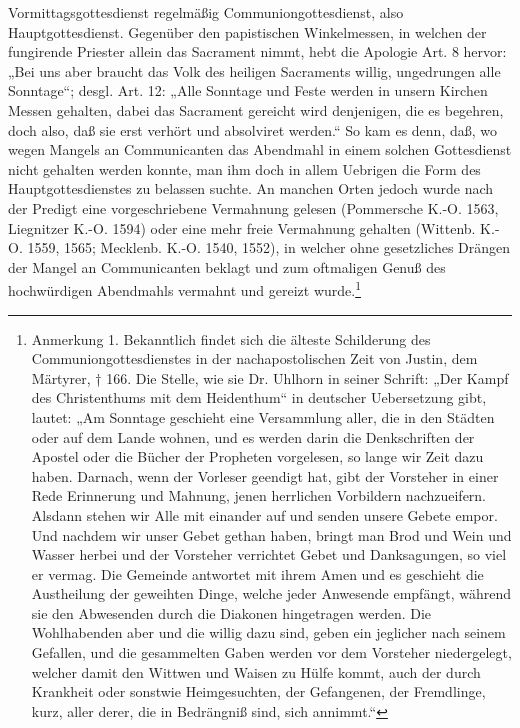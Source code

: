 Vormittagsgottesdienst regelmäßig Communiongottesdienst, also Hauptgottesdienst. Gegenüber den papistischen Winkelmessen, in welchen der fungirende Priester allein das Sacrament nimmt, hebt die Apologie Art. 8 hervor: „Bei uns aber braucht das Volk des heiligen Sacraments willig, ungedrungen alle Sonntage“; desgl. Art. 12: „Alle Sonntage und Feste werden in unsern Kirchen Messen gehalten, dabei das Sacrament gereicht wird denjenigen, die es begehren, doch also, daß sie erst verhört und absolviret werden.“ So kam es denn, daß, wo wegen Mangels an Communicanten das Abendmahl in einem solchen Gottesdienst nicht gehalten werden konnte, man ihm doch in allem Uebrigen die Form des Hauptgottesdienstes zu belassen suchte. An manchen Orten jedoch wurde nach der Predigt eine vorgeschriebene Vermahnung gelesen (Pommersche K.-O. 1563, Liegnitzer K.-O. 1594) oder eine mehr freie Vermahnung gehalten (Wittenb. K.-O. 1559, 1565; Mecklenb. K.-O. 1540, 1552), in welcher ohne gesetzliches Drängen der Mangel an Communicanten beklagt und zum oftmaligen Genuß des hochwürdigen Abendmahls vermahnt und gereizt wurde.\footnote{Anmerkung 1. Bekanntlich findet sich die älteste Schilderung des Communiongottesdienstes in der nachapostolischen Zeit von Justin, dem Märtyrer, † 166. Die Stelle, wie sie Dr. Uhlhorn in seiner Schrift: „Der Kampf des Christenthums mit dem Heidenthum“ in deutscher Uebersetzung gibt, lautet: „Am Sonntage geschieht eine Versammlung aller, die in den Städten oder auf dem Lande wohnen, und es werden darin die Denkschriften der Apostel oder die Bücher der Propheten vorgelesen, so lange wir Zeit dazu haben. Darnach, wenn der Vorleser geendigt hat, gibt der Vorsteher in einer Rede Erinnerung und Mahnung, jenen herrlichen Vorbildern nachzueifern. Alsdann stehen wir Alle mit einander auf und senden unsere Gebete empor. Und nachdem wir unser Gebet gethan haben, bringt man Brod und Wein und Wasser herbei und der Vorsteher verrichtet Gebet und Danksagungen, so viel er vermag. Die Gemeinde antwortet mit ihrem Amen und es geschieht die Austheilung der geweihten Dinge, welche jeder Anwesende empfängt, während sie den Abwesenden durch die Diakonen hingetragen werden. Die Wohlhabenden aber und die willig dazu sind, geben ein jeglicher nach seinem Gefallen, und die gesammelten Gaben werden vor dem Vorsteher niedergelegt, welcher damit den Wittwen und Waisen zu Hülfe kommt, auch der durch Krankheit oder sonstwie Heimgesuchten, der Gefangenen, der Fremdlinge, kurz, aller derer, die in Bedrängniß sind, sich annimmt.“}

